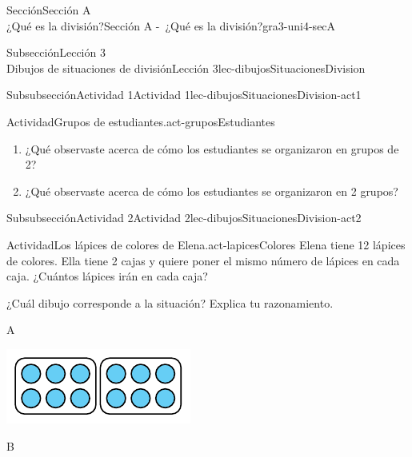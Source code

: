 \begin{sectionptx}{Sección}{{\Large Sección A\\}¿Qué es la división?}{}{Sección A -~¿Qué es la división?}{}{}{gra3-uni4-secA}
\begin{subsectionptx}{Subsección}{{\normalsize Lección 3\\[-0.05cm]}Dibujos de situaciones de división}{}{Lección 3}{}{}{lec-dibujosSituacionesDivision}
\begin{subsubsectionptx}{Subsubsección}{Actividad 1}{}{Actividad 1}{}{}{lec-dibujosSituacionesDivision-act1}
\begin{activity}{Actividad}{Grupos de estudiantes.}{act-gruposEstudiantes}%
%
\begin{enumerate}
\item{}¿Qué observaste acerca de cómo los estudiantes se organizaron en grupos de 2?%
\item{}¿Qué observaste acerca de cómo los estudiantes se organizaron en 2 grupos?%
\end{enumerate}
%
\end{activity}%
\end{subsubsectionptx}
%
%
\typeout{************************************************}
\typeout{************************************************}
%
\begin{subsubsectionptx}{Subsubsección}{Actividad 2}{}{Actividad 2}{}{}{lec-dibujosSituacionesDivision-act2}
\begin{activity}{Actividad}{Los lápices de colores de Elena.}{act-lapicesColores}%
Elena tiene 12 lápices de colores. Ella tiene 2 cajas y quiere poner el mismo número de lápices en cada caja. ¿Cuántos lápices irán en cada caja?%
\par
¿Cuál dibujo corresponde a la situación? Explica tu razonamiento.%
\begin{sidebyside}{2}{0}{0}{0}%
\begin{sbspanel}{0.5}%
A%
\par
\includegraphics[max width=\linewidth, center]{external/tikz-source/tikz-file-149310.pdf}
\end{sbspanel}%
\begin{sbspanel}{0.5}%
B%
\par

\end{sbspanel}
\end{sidebyside}
\end{activity}
\end{subsubsectionptx}
\end{subsectionptx}
\end{sectionptx}
